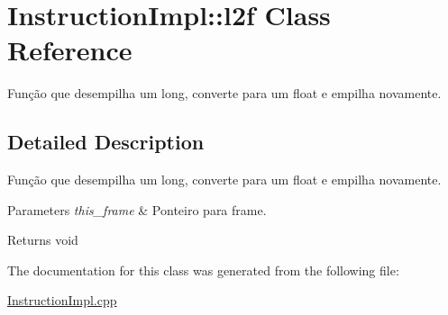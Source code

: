 \hypertarget{class_instruction_impl_1_1l2f}{}\section{Instruction\+Impl\+:\+:l2f Class Reference}
\label{class_instruction_impl_1_1l2f}


Função que desempilha um long, converte para um float e empilha novamente.  




\subsection{Detailed Description}
Função que desempilha um long, converte para um float e empilha novamente. 


\begin{DoxyParams}{Parameters}
{\em this\+\_\+frame} & Ponteiro para frame. \\
\hline
\end{DoxyParams}
\begin{DoxyReturn}{Returns}
void 
\end{DoxyReturn}


The documentation for this class was generated from the following file\+:\begin{DoxyCompactItemize}
\item 
\hyperlink{_instruction_impl_8cpp}{Instruction\+Impl.\+cpp}\end{DoxyCompactItemize}
